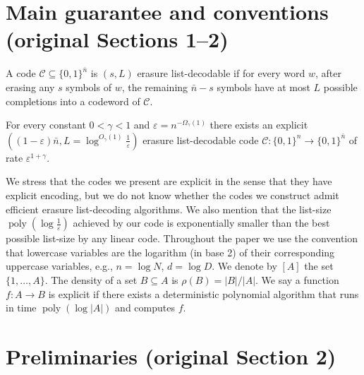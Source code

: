 \section*{Main guarantee and conventions (original Sections 1--2)}
A code $\mathcal C\subseteq\{0,1\}^{\bar n}$ is $(s,L)$ erasure list-decodable if for every word $w$, after erasing any $s$ symbols of $w$, the remaining $\bar n-s$ symbols have at most $L$ possible completions into a codeword of $\mathcal C$.
\setcounter{theorem}{1}
\begin{theorem}
For every constant $0<\gamma<1$ and $\varepsilon=n^{-\Omega_\gamma(1)}$ there exists an explicit $((1-\varepsilon)\bar n,L=\log^{O_\gamma(1)}\frac1\varepsilon)$ erasure list-decodable code $\mathcal C:\{0,1\}^n\to\{0,1\}^{\bar n}$ of rate $\varepsilon^{1+\gamma}$.
\end{theorem}
We stress that the codes we present are explicit in the sense that they have explicit encoding, but we do not know whether the codes we construct admit efficient erasure list-decoding algorithms. We also mention that the list-size $\operatorname{poly}(\log\frac1\varepsilon)$ achieved by our code is exponentially smaller than the best possible list-size by any linear code.
Throughout the paper we use the convention that lowercase variables are the logarithm (in base 2) of their corresponding uppercase variables, e.g., $n=\log N$, $d=\log D$. We denote by $[A]$ the set $\{1,\ldots,A\}$. The density of a set $B\subseteq A$ is $\rho(B)=|B|/|A|$. We say a function $f:A\to B$ is explicit if there exists a deterministic polynomial algorithm that runs in time $\operatorname{poly}(\log|A|)$ and computes $f$.
\section*{Preliminaries (original Section 2)}
